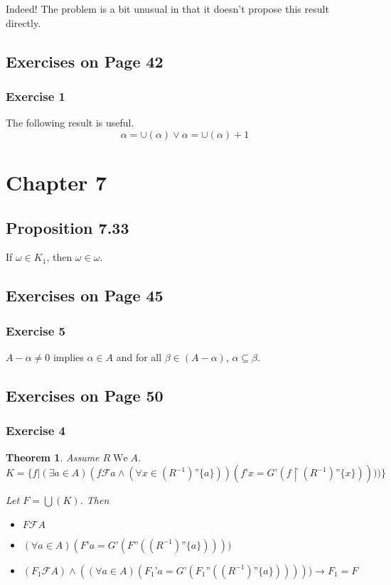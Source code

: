 \documentclass{article}
\DeclareMathOperator{\We}{We}
\newcommand{\RelationLessThan}[2]{(#1^{-1})\text{''}\{#2\}}
\newcommand{\RLessThan}[1]{\RelationLessThan{R}{#1}}
\newtheorem{theorem}{Theorem}
\begin{document}
Indeed! The problem is a bit unusual in that it doesn't propose this result
directly.

\subsection{Exercises on Page 42}
\subsubsection{Exercise 1}
The following result is useful.
\[
  \alpha = \cup (\alpha) \vee \alpha = \cup (\alpha) + 1
\]

\section{Chapter 7}

\subsection{Proposition 7.33}
If \(\omega \in K_1\), then \(\omega \in \omega\).

\subsection{Exercises on Page 45}
\subsubsection{Exercise 5}
\(A - \alpha \neq 0\) implies \(\alpha \in A\) and for all \(\beta \in (A -
\alpha)\), \(\alpha \subseteq \beta\).

\subsection{Exercises on Page 50}
\subsubsection{Exercise 4}
\begin{theorem}
Assume \(R \We A\).
\[
  K = \{f \vert (\exists a \in A) (f \mathscr{F} a \wedge
    (\forall x \in \RLessThan{a}))(f\text{'}x = G\text{'}(f \restriction
        \RLessThan{x})))) \}
\]

  Let \(F = \bigcup (K)\). Then
  \begin{itemize}
    \item \(F \mathscr{F} A\)
    \item \((\forall a \in A) (F \text{'}a =
      G\text{'}(F\text{''}(\RLessThan{a}))))\)
    \item \((F_1 \mathscr{F} A) \wedge
     ((\forall a \in A) (F_1 \text{'}a =
      G\text{'}(F_1 \text{''}(\RLessThan{a})))))
      \rightarrow F_1 = F\)
  \end{itemize}
\end{theorem}
\end{document}
